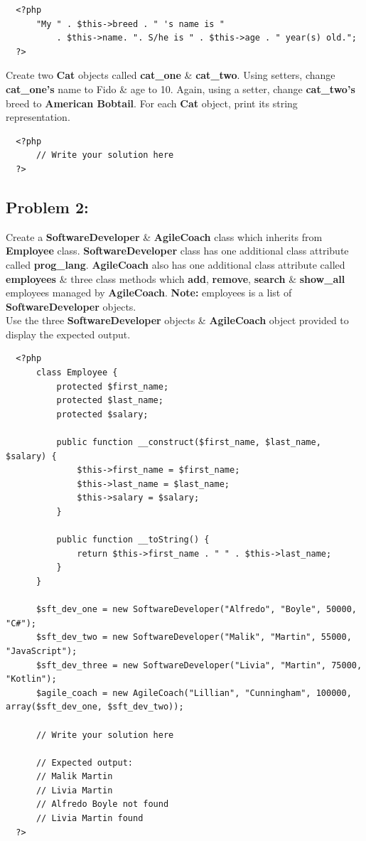 \documentclass{article}
\begin{document}
\begin{verbatim}
  <?php
      "My " . $this->breed . " 's name is " 
          . $this->name. ". S/he is " . $this->age . " year(s) old.";  
  ?>
\end{verbatim}

Create two \textbf{Cat} objects called \textbf{cat\_one} \& \textbf{cat\_two}. Using setters, change \textbf{cat\_one's} name to Fido \& age to 10. Again, using a setter, change \textbf{cat\_two's} breed to \textbf{American Bobtail}. For each \textbf{Cat} object, print its string representation.

\begin{verbatim}
  <?php
      // Write your solution here
  ?>
\end{verbatim}

\subsection*{Problem 2:} 
Create a \textbf{SoftwareDeveloper} \& \textbf{AgileCoach} class which inherits from \textbf{Employee} class. \textbf{SoftwareDeveloper} class has one additional class attribute called \textbf{prog\_lang}. \textbf{AgileCoach} also has one additional class attribute called \textbf{employees} \& three class methods which \textbf{add}, \textbf{remove}, \textbf{search} \& \textbf{show\_all} employees managed by \textbf{AgileCoach}. \textbf{Note:} employees is a list of \textbf{SoftwareDeveloper} objects. \\

Use the three \textbf{SoftwareDeveloper} objects \& \textbf{AgileCoach} object provided to display the expected output.

\begin{verbatim}
  <?php
      class Employee {
          protected $first_name;
          protected $last_name;
          protected $salary;

          public function __construct($first_name, $last_name, $salary) {
              $this->first_name = $first_name;
              $this->last_name = $last_name;
              $this->salary = $salary;
          }

          public function __toString() {
              return $this->first_name . " " . $this->last_name;
          }
      }

      $sft_dev_one = new SoftwareDeveloper("Alfredo", "Boyle", 50000, "C#");
      $sft_dev_two = new SoftwareDeveloper("Malik", "Martin", 55000, "JavaScript");
      $sft_dev_three = new SoftwareDeveloper("Livia", "Martin", 75000, "Kotlin");
      $agile_coach = new AgileCoach("Lillian", "Cunningham", 100000, array($sft_dev_one, $sft_dev_two));

      // Write your solution here

      // Expected output:
      // Malik Martin
      // Livia Martin
      // Alfredo Boyle not found
      // Livia Martin found
  ?>
\end{verbatim}
\end{document}
